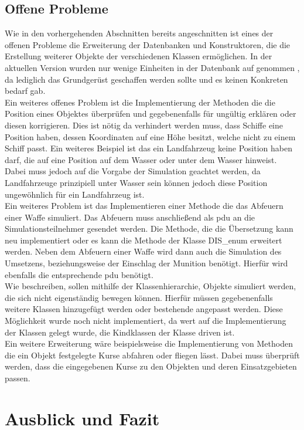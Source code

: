 \section{Offene Probleme}
Wie in den vorhergehenden Abschnitten bereits angeschnitten ist eines der offenen Probleme die Erweiterung der Datenbanken und Konstruktoren, die die Erstellung weiterer Objekte der verschiedenen Klassen ermöglichen. In der aktuellen Version wurden nur wenige Einheiten in der Datenbank auf genommen , da lediglich das Grundgerüst geschaffen werden sollte und es keinen Konkreten bedarf gab. \\
Ein weiteres offenes Problem ist die Implementierung der Methoden die die Position eines Objektes überprüfen und gegebenenfalls für ungültig erklären oder diesen korrigieren.  Dies ist nötig da verhindert werden muss, dass Schiffe eine Position haben, dessen Koordinaten auf eine Höhe besitzt, welche nicht zu einem Schiff passt. Ein weiteres Beispiel ist das ein Landfahrzeug  keine Position haben darf, die auf eine Position auf dem Wasser oder unter dem Wasser hinweist. Dabei muss jedoch auf die Vorgabe der Simulation geachtet werden, da Landfahrzeuge prinzipiell unter Wasser sein können jedoch diese Position ungewöhnlich für ein Landfahrzeug ist.\\
Ein weiteres Problem ist das Implementieren einer Methode die das Abfeuern einer Waffe simuliert. Das Abfeuern muss anschließend als \ac{pdu} an die Simulationsteilnehmer gesendet werden. Die Methode, die die Übersetzung kann neu implementiert oder es kann die Methode der Klasse \glqq DIS\_enum\grqq{} erweitert werden. Neben dem Abfeuern einer Waffe wird dann auch die Simulation des Umsetzens, beziehungsweise der Einschlag der Munition benötigt. Hierfür wird ebenfalls die entsprechende  \ac{pdu} benötigt.\\
Wie beschreiben, sollen mithilfe der Klassenhierarchie, Objekte simuliert werden, die sich nicht eigenständig bewegen können. Hierfür müssen gegebenenfalls weitere Klassen hinzugefügt werden oder bestehende angepasst werden. Diese Möglichkeit wurde noch nicht implementiert, da wert auf die Implementierung der Klassen gelegt wurde, die Kindklassen der Klasse  \glqq driven\grqq{} ist. \\
Ein weitere Erweiterung wäre beispielsweise die Implementierung von Methoden die ein Objekt festgelegte Kurse abfahren oder fliegen lässt. Dabei muss überprüft werden, dass die eingegebenen Kurse zu den Objekten und deren Einsatzgebieten passen. 
\chapter{Ausblick und Fazit}


